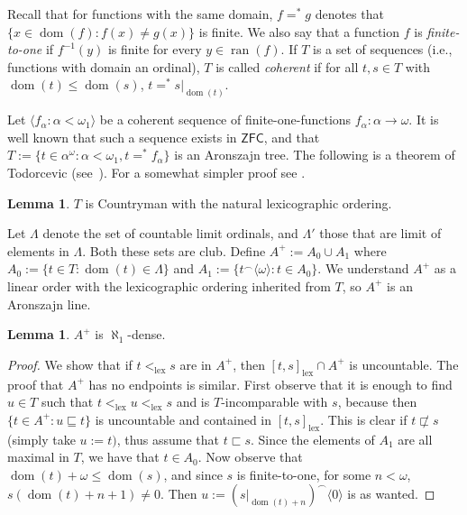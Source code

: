 \documentclass[10pt]{amsart}
\theoremstyle{definition}
\newtheorem{lemma}[theorem]{Lemma}
\theoremstyle{remark}
\newcommand{\tup}[1]{\langle#1\rangle}
\newcommand{\axiom}[1]{\mathsf{#1}}
\newcommand{\ZFC}{\axiom{ZFC}}
\newcommand\lex{\mathrm{lex}}
\newcommand{\1}{\mathbbm{1}}
\newcommand{\tleq}{\sqsubseteq}
\newcommand{\tle}{\sqsubset}
\DeclareMathOperator{\dom}{dom}
\DeclareMathOperator{\ran}{ran}
\begin{document}
Recall that for functions with the same domain,
$f =^{*} g$ denotes that $\{x \in \dom(f) : f(x) \neq g(x)\}$ is finite.
We also say that a function $f$ is \emph{finite-to-one} if $f^{-1}(y)$
is finite for every $y \in \ran(f)$. If $T$ is a set of
sequences (i.e., functions with domain an ordinal), $T$ is called
\emph{coherent} if for all $t,s \in T$ with $\dom(t) \le \dom(s)$,
$t =^{*} s|_{\dom(t)}$.

Let $\tup{f_{\alpha} : \alpha < \omega_{1}}$ be a coherent
sequence of finite-one-functions $f_{\alpha} : \alpha \to \omega$.
It is well known that such a sequence exists in $\ZFC$, and that
$T := \{t \in \alpha^{\omega} : \alpha < \omega_{1}, t =^{*} f_{\alpha}\}$
is an Aronszajn tree. The following is a theorem
of Todorcevic (see~\cite{Todorcevic1987}). For a somewhat simpler
proof see \cite{KomjathTotik}.

\begin{lemma}\label{lem:coherent-fin-countryman}
  $T$ is Countryman with the natural lexicographic ordering.
\end{lemma}

Let $\Lambda$ denote the set of countable limit ordinals,
and $\Lambda'$ those that are limit of elements in $\Lambda$. Both these
sets are club. Define $A^{+} := A_{0} \cup A_{1}$ where
$A_{0} := \{t \in T : \dom(t) \in \Lambda\}$ and
$A_{1} := \{t^{\frown}\tup{\omega} : t \in A_{0}\}$. We understand $A^{+}$
as a linear order with the lexicographic ordering inherited from $T$,
so $A^{+}$ is an Aronszajn line.

\begin{lemma}\label{lem:Aplus-dense}
  $A^+$ is $\aleph_{1}$-dense.
\end{lemma}
\begin{proof}
  We show that if $t <_{\lex} s$ are in $A^{+}$, then
  $[t,s]_{\lex} \cap A^+$ is uncountable. The proof that $A^+$ has
  no endpoints is similar. First observe that it is enough
  to find $u \in T$ such that $t <_{\lex} u <_{\lex} s$ and
  is $T$-incomparable with $s$, because then $\{t \in A^{+} : u \tleq t\}$
  is uncountable and contained in $[t,s]_{\lex}$. This is clear
  if $t \not\tle s$ (simply take $u := t)$, thus assume that $t \tle s$. Since
  the elements of $A_{1}$ are all maximal in $T$, we have that
  $t \in A_{0}$.
  Now observe that
  $\dom(t) + \omega \le \dom(s)$, and since $s$ is finite-to-one, for
  some $n < \omega$, $s(\dom(t) + n + 1) \neq 0$. Then
  $u := (s|_{\dom(t) + n})^{\frown}\tup{0}$ is as wanted.
\end{proof}
\end{document}
